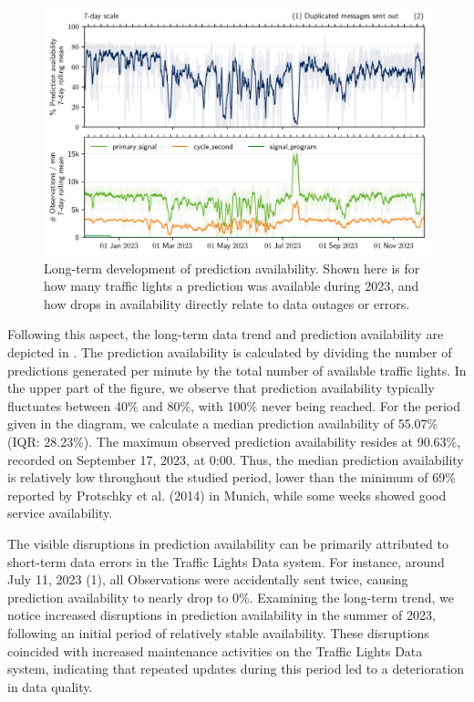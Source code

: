 \begin{figure}[t]
    \centering
    \includegraphics[width=\linewidth]{images/monitoring-availability.pdf}
    \caption{Long-term development of prediction availability. Shown here is for how many traffic lights a prediction was available during 2023, and how drops in availability directly relate to data outages or errors.}\label{fig:monitoring-availability}
\end{figure}

Following this aspect, the long-term data trend and prediction availability are depicted in . The prediction availability is calculated by dividing the number of predictions generated per minute by the total number of available traffic lights. In the upper part of the figure, we observe that prediction availability typically fluctuates between 40\% and 80\%, with 100\% never being reached. For the period given in the diagram, we calculate a median prediction availability of 55.07\% (IQR: 28.23\%). The maximum observed prediction availability resides at 90.63\%, recorded on September 17, 2023, at 0:00. Thus, the median prediction availability is relatively low throughout the studied period, lower than the minimum of 69\% reported by Protschky et al. (2014) \cite{protschky_extensive_2014, protschky_adaptive_2014} in Munich, while some weeks showed good service availability.

The visible disruptions in prediction availability can be primarily attributed to short-term data errors in the Traffic Lights Data system. For instance, around July 11, 2023 (1), all Observations were accidentally sent twice, causing prediction availability to nearly drop to 0\%. Examining the long-term trend, we notice increased disruptions in prediction availability in the summer of 2023, following an initial period of relatively stable availability. These disruptions coincided with increased maintenance activities on the Traffic Lights Data system, indicating that repeated updates during this period led to a deterioration in data quality. 

